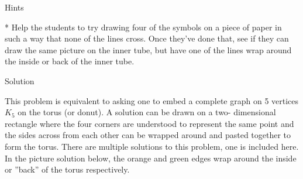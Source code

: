 

Hints

* Help the students to try drawing four of the symbols on a piece of paper
in such a way that none of the lines cross. Once they’ve done that, see
if they can draw the same picture on the inner tube, but have one of the
lines wrap around the inside or back of the inner tube.

Solution

This problem is equivalent to asking one to embed a complete graph on
5 vertices \(K_5\) on the torus (or donut). A solution can be drawn on a two-
dimensional rectangle where the four corners are understood to represent the
same point and the sides across from each other can be wrapped around and
pasted together to form the torus. There are multiple solutions to this problem,
one is included here. In the picture solution below, the orange and green edges
wrap around the inside or ”back” of the torus respectively.
